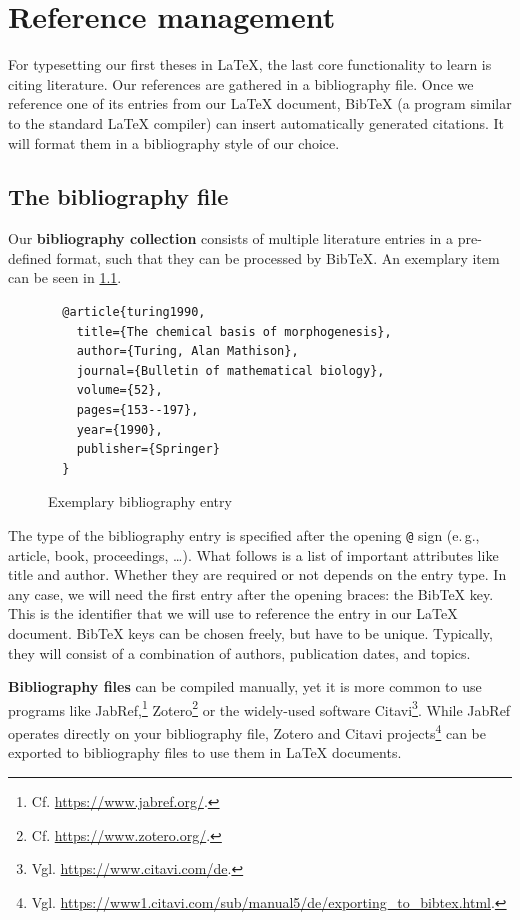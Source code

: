 \chapter{Reference management}
\label{sec:literature}

For typesetting our first theses in \LaTeX{}, the last core functionality to learn is citing literature.
Our references are gathered in a bibliography file.
Once we reference one of its entries from our \LaTeX{} document, Bib\TeX{} (a program similar to the standard \LaTeX{} compiler) can insert automatically generated citations.
It will format them in a bibliography style of our choice.

\section{The bibliography file}
Our \textbf{bibliography collection} consists of multiple literature entries in a pre-defined format, such that they can be processed by Bib\TeX{}.
An exemplary item can be seen in \cref{lst:bibfile-sample-entry}.

\begin{figure}[H]
  \begin{verbatim}
  @article{turing1990,
    title={The chemical basis of morphogenesis},
    author={Turing, Alan Mathison},
    journal={Bulletin of mathematical biology},
    volume={52},
    pages={153--197},
    year={1990},
    publisher={Springer}
  }
  \end{verbatim}
  \caption{Exemplary bibliography entry}
  \label{lst:bibfile-sample-entry}
\end{figure}

The type of the bibliography entry is specified after the opening \texttt{@} sign (e.\,g., article, book, proceedings, …).
What follows is a list of important attributes like title and author.
Whether they are required or not depends on the entry type.
In any case, we will need the first entry after the opening braces: the Bib\TeX{} key.
This is the identifier that we will use to reference the entry in our \LaTeX{} document.
Bib\TeX{} keys can be chosen freely, but have to be unique.
Typically, they will consist of a combination of authors, publication dates, and topics.

\textbf{Bibliography files} can be compiled manually, yet it is more common to use programs like JabRef,\footnote{Cf. \url{https://www.jabref.org/}.} Zotero\footnote{Cf. \url{https://www.zotero.org/}.} or the widely-used software Citavi\footnote{Vgl. \url{https://www.citavi.com/de}.}.
While JabRef operates directly on your bibliography file, Zotero and Citavi projects\footnote{Vgl. \url{https://www1.citavi.com/sub/manual5/de/exporting_to_bibtex.html}.} can be exported to bibliography files to use them in \LaTeX{} documents.

